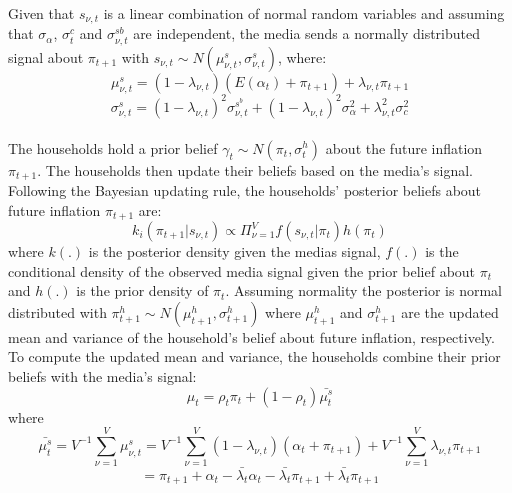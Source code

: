 \documentclass[review]{elsarticle}
\begin{document}
Given that $s_{\nu,t}$ is a linear combination of normal random variables and assuming that $\sigma_{\alpha}$, $\sigma^c_t$ and $\sigma^{sb}_{\nu,t}$ are independent, the media sends a normally distributed signal about $\pi_{t+1}$ with $s_{\nu,t} \sim N(\mu^s_{\nu,t}, \sigma^s_{\nu,t})$, where:
\begin{equation} 
\mu_{\nu,t}^s = (1-\lambda_{\nu,t}) (E(\alpha_t) + \pi_{t+1}) + \lambda_{\nu,t} \pi_{t+1} 
\end{equation}
\begin{equation}
\sigma_{\nu,t}^s = (1-\lambda_{\nu,t})^2 \sigma_{\nu,t}^{s^b} +(1-\lambda_{\nu,t})^2 \sigma_{\alpha}^2 + \lambda_{\nu,t}^2 \sigma_c^2 
\end{equation}
\\
The households hold a prior belief $\gamma_t \sim N(\pi_t, \sigma^h_t)$ about the future inflation $\pi_{t+1}$. The households then update their beliefs based on the media's signal. Following the Bayesian updating rule, the households' posterior beliefs about future inflation $\pi_{t+1}$ are:
\begin{equation}
k_i(\pi_{t+1}|s_{\nu,t}) \propto \Pi^V_{\nu = 1} f(s_{\nu,t}|\pi_t) h(\pi_t)
\end{equation}
where $k(.)$ is the posterior density given the medias signal, $f(.)$ is the conditional density of the observed media signal given the prior belief about $\pi_t$ and $h(.)$ is the prior density of $\pi_t$. Assuming normality the posterior is normal distributed with $\pi_{t+1}^h \sim N(\mu^h_{t+1}, \sigma^h_{t+1})$ where $\mu^h_{t+1}$ and $\sigma^h_{t+1}$ are the updated mean and variance of the household's belief about future inflation, respectively. To compute the updated mean and variance, the households combine their prior beliefs with the media's signal:
\begin{equation}
\mu_t = \rho_t \pi_t + (1- \rho_t) \bar{\mu_t^s} 
\end{equation}
where
\begin{equation}
\bar{\mu_t^s} = V^{-1} \sum^V_{\nu = 1} \mu_{\nu,t}^s = V^{-1} \sum^V_{\nu =1} (1-\lambda_{\nu,t}) (\alpha_t + \pi_{t+1}) + V^{-1} \sum^V_{\nu =1} \lambda_{\nu,t} \pi_{t+1}  
\end{equation}
\begin{equation}
=\pi_{t+1} + \alpha_t - \bar{\lambda_t} \alpha_t - \bar{\lambda_t} \pi_{t+1} + \bar{\lambda_t}\pi_{t+1} 
\end{equation}
\end{document}

